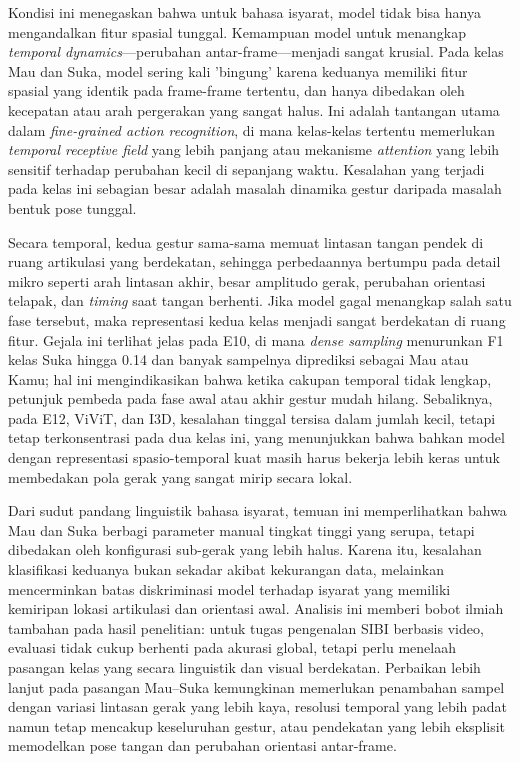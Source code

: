 Kondisi ini menegaskan bahwa untuk bahasa isyarat, model tidak bisa hanya mengandalkan fitur spasial tunggal. Kemampuan model untuk menangkap \textit{temporal dynamics}---perubahan antar-frame---menjadi sangat krusial. Pada kelas Mau dan Suka, model sering kali 'bingung' karena keduanya memiliki fitur spasial yang identik pada frame-frame tertentu, dan hanya dibedakan oleh kecepatan atau arah pergerakan yang sangat halus. Ini adalah tantangan utama dalam \textit{fine-grained action recognition}, di mana kelas-kelas tertentu memerlukan \textit{temporal receptive field} yang lebih panjang atau mekanisme \textit{attention} yang lebih sensitif terhadap perubahan kecil di sepanjang waktu. Kesalahan yang terjadi pada kelas ini sebagian besar adalah masalah dinamika gestur daripada masalah bentuk pose tunggal.\par

Secara temporal, kedua gestur sama-sama memuat lintasan tangan pendek di ruang artikulasi yang berdekatan, sehingga perbedaannya bertumpu pada detail mikro seperti arah lintasan akhir, besar amplitudo gerak, perubahan orientasi telapak, dan \textit{timing} saat tangan berhenti. Jika model gagal menangkap salah satu fase tersebut, maka representasi kedua kelas menjadi sangat berdekatan di ruang fitur. Gejala ini terlihat jelas pada E10, di mana \textit{dense sampling} menurunkan F1 kelas Suka hingga 0.14 dan banyak sampelnya diprediksi sebagai Mau atau Kamu; hal ini mengindikasikan bahwa ketika cakupan temporal tidak lengkap, petunjuk pembeda pada fase awal atau akhir gestur mudah hilang. Sebaliknya, pada E12, ViViT, dan I3D, kesalahan tinggal tersisa dalam jumlah kecil, tetapi tetap terkonsentrasi pada dua kelas ini, yang menunjukkan bahwa bahkan model dengan representasi spasio-temporal kuat masih harus bekerja lebih keras untuk membedakan pola gerak yang sangat mirip secara lokal.\par

Dari sudut pandang linguistik bahasa isyarat, temuan ini memperlihatkan bahwa Mau dan Suka berbagi parameter manual tingkat tinggi yang serupa, tetapi dibedakan oleh konfigurasi sub-gerak yang lebih halus. Karena itu, kesalahan klasifikasi keduanya bukan sekadar akibat kekurangan data, melainkan mencerminkan batas diskriminasi model terhadap isyarat yang memiliki kemiripan lokasi artikulasi dan orientasi awal. Analisis ini memberi bobot ilmiah tambahan pada hasil penelitian: untuk tugas pengenalan SIBI berbasis video, evaluasi tidak cukup berhenti pada akurasi global, tetapi perlu menelaah pasangan kelas yang secara linguistik dan visual berdekatan. Perbaikan lebih lanjut pada pasangan Mau--Suka kemungkinan memerlukan penambahan sampel dengan variasi lintasan gerak yang lebih kaya, resolusi temporal yang lebih padat namun tetap mencakup keseluruhan gestur, atau pendekatan yang lebih eksplisit memodelkan pose tangan dan perubahan orientasi antar-frame.\par



